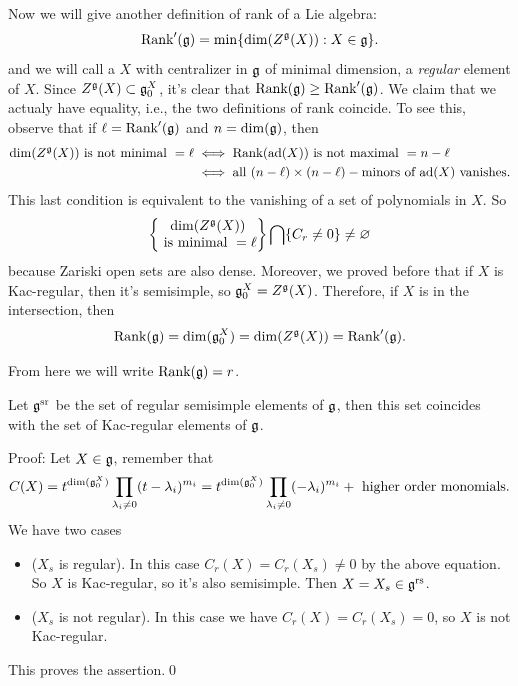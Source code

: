 Now we will give another definition of rank of a Lie algebra: 
\begin{equation}
    \text{Rank}^\prime(\mathfrak{g})=\min\{\dim(Z^{\mathfrak{g}}(X)):X\in\mathfrak{g}\}.
\end{equation}
and we will call a $X$ with centralizer in $\mathfrak{g}$ of minimal dimension, a \textit{regular} element of $X$.
Since $Z^{\mathfrak{g}}(X)\subset \mathfrak{g}_0^X$, it's clear that $\text{Rank}(\mathfrak{g})\geq \text{Rank}^\prime(\mathfrak{g})$. We claim 
that we actualy have equality, i.e., the two definitions of rank coincide. To see this, observe that if 
$\ell=\text{Rank}^\prime(\mathfrak{g})$ and $n=\dim(\mathfrak{g})$, then
\begin{equation}
    \begin{split}
       \dim(Z^{\mathfrak{g}}(X)) \text{ is not minimal }=\ell&\iff \text{Rank}(\text{ad}(X))\text{ is not maximal }=n-\ell\\
        &\iff \text{all }(n-\ell)\times(n-\ell)-\text{minors of }\text{ad}(X)\text{ vanishes}.
    \end{split}
\end{equation} 
This last condition is equivalent to the vanishing of a set of polynomials in $X$. So 
\begin{equation}
    \left\{\begin{matrix}
      \dim(Z^{\mathfrak{g}}(X))  \\
      \text{ is minimal }=\ell
    \end{matrix}\right\}\bigcap \{C_r\neq0\}\neq\varnothing
\end{equation}
because Zariski open sets are also dense. Moreover, we proved before that if $X$ is Kac-regular, then it's semisimple, so 
$\mathfrak{g}_0^X=Z^{\mathfrak{g}}(X)$. Therefore, if $X$ is in the intersection, then 
\begin{equation}
    \text{Rank}(\mathfrak{g})=\dim(\mathfrak{g}_0^X)=\dim(Z^{\mathfrak{g}}(X))=\text{Rank}^\prime(\mathfrak{g}).
\end{equation}

From here we will write $\text{Rank}(\mathfrak{g})=r$.

\begin{dang}
    \begin{theorem}
        Let $\mathfrak{g}^{\text{sr}}$ be the set of regular semisimple elements of $\mathfrak{g}$, then this set coincides 
        with the set of Kac-regular elements of $\mathfrak{g}$.
    \end{theorem}
\end{dang}
Proof: Let $X\in\mathfrak{g}$, remember that 
\begin{equation}
    C(X)=t^{\dim(\mathfrak{g}_0^X)}\prod_{\lambda_i\neq0}(t-\lambda_i)^{m_i}
    =t^{\dim(\mathfrak{g}_0^X)}\prod_{\lambda_i\neq0}(-\lambda_i)^{m_i}+\text{ higher order monomials}.
\end{equation}
We have two cases 
\begin{itemize}
    \item($X_s$ is regular). In this case $C_r(X)=C_r(X_s)\neq0$ by the above equation. So 
    $X$ is Kac-regular, so it's also semisimple. Then $X=X_s\in\mathfrak{g}^{\text{rs}}$.
    \item($X_s$ is not regular).  In this case we have $C_r(X)=C_r(X_s)=0$, so $X$ is not Kac-regular.
\end{itemize}
This proves the assertion.\qed


